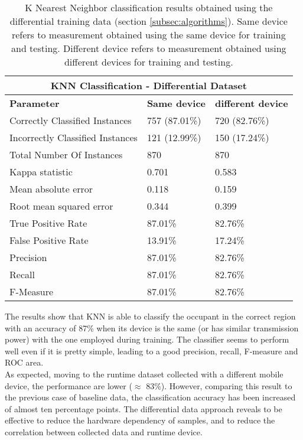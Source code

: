 \begin{table}
\caption[K Nearest Neighbor classification results obtained using the differential training data.]{K Nearest Neighbor classification results obtained using the differential training data (section \ref{subsec:algorithms}). Same device refers to measurement obtained using the same device for training and testing. Different device refers to measurement obtained using different devices for training and testing.}
\label{tab:knn-diff}
\begin{tabular}{ |l|l|l| }
  \hline
  \multicolumn{3}{|c|}{\textbf{KNN Classification - Differential Dataset}} \\
  \hline
  \textbf{Parameter} & \textbf{Same device} & \textbf{different device}\\
  \hline
  Correctly Classified Instances & 757 (87.01\%) & 720 (82.76\%) \\
  Incorrectly Classified Instances & 121 (12.99\%) & 150 (17.24\%) \\
  Total Number Of Instances & 870 & 870 \\
  Kappa statistic & 0.701 & 0.583 \\
  Mean absolute error & 0.118 & 0.159 \\
  Root mean squared error & 0.344 & 0.399 \\
  True Positive Rate & 87.01\% & 82.76\% \\
  False Positive Rate & 13.91\% & 17.24\% \\
  Precision & 87.01\% & 82.76\% \\
  Recall & 87.01\% & 82.76\% \\
  F-Measure & 87.01\% & 82.76\% \\
  \hline
\end{tabular}
\end{table}

The results show that KNN is able to classify the occupant in the correct region with an accuracy of 87\% when its device is the same (or has similar transmission power) with the one employed during training.
The classifier seems to perform well even if it is pretty simple, leading to a good precision, recall, F-measure and ROC area.\\
As expected, moving to the runtime dataset collected with a different mobile device, the performance are lower ($\approx$ 83\%). However, comparing this result to the previous case of baseline data, the classification accuracy has been increased of almost ten percentage points. The differential data approach reveals to be effective to reduce the hardware dependency of samples, and to reduce the correlation between collected data and runtime device.


